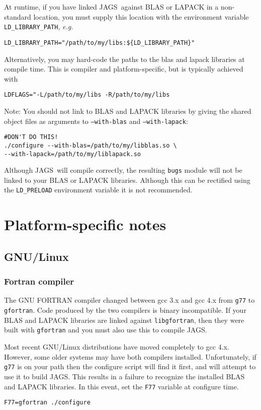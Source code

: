 \documentclass[11pt, a4paper, titlepage]{report}
\newcommand{\JAGS}{\textsf{JAGS}}
\begin{document}
At runtime, if you have linked \JAGS\ against BLAS or LAPACK in
a non-standard location, you must supply this location with the
environment variable \verb+LD_LIBRARY_PATH+, {\em e.g.}
\begin{verbatim}
LD_LIBRARY_PATH="/path/to/my/libs:${LD_LIBRARY_PATH}"
\end{verbatim} %
Alternatively, you may hard-code the paths to the blas and lapack
libraries at compile time. This is compiler and platform-specific,
but is typically achieved with
\begin{verbatim}
LDFLAGS="-L/path/to/my/libs -R/path/to/my/libs
\end{verbatim}

Note: You should not link to BLAS and LAPACK libraries by giving
the shared object files as arguments to \texttt{--with-blas} and
\texttt{--with-lapack}:
\begin{verbatim}
#DON'T DO THIS!
./configure --with-blas=/path/to/my/libblas.so \
--with-lapack=/path/to/my/liblapack.so 
\end{verbatim}
Although \JAGS\ will compile correctly, the resulting \texttt{bugs}
module will not be linked to your BLAS or LAPACK libraries.  Although
this can be rectified using the \verb+LD_PRELOAD+ environment variable
it is not recommended.

\section{Platform-specific notes}

\subsection{GNU/Linux}
\label{section:gnulinux}

\subsubsection{Fortran compiler}

The GNU FORTRAN compiler changed between gcc 3.x and gcc 4.x from
\verb+g77+ to \verb+gfortran+. Code produced by the two compilers is
binary incompatible. If your BLAS and LAPACK libraries are linked
against \verb+libgfortran+, then they were built with \verb+gfortran+
and you must also use this to compile \JAGS. 

Most recent GNU/Linux distributions have moved completely to gcc 4.x.
However, some older systems may have both compilers installed.
Unfortunately, if \verb+g77+ is on your path then the configure script
will find it first, and will attempt to use it to build \JAGS. This
results in a failure to recognize the installed BLAS and LAPACK
libraries. In this event, set the \verb+F77+ variable at configure time.
\begin{verbatim}
F77=gfortran ./configure
\end{verbatim}
\end{document}
